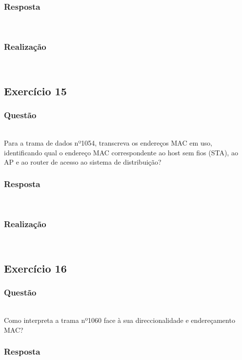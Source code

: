 \documentclass{llncs}
\begin{document}
\subsubsection{Resposta}\rule[-10pt]{0pt}{10pt}\\


\subsubsection{Realização}\rule[-10pt]{0pt}{10pt}\\


\clearpage
\subsection{Exercício 15}
\subsubsection{Questão}\rule[-10pt]{0pt}{10pt}\\

Para a trama de dados nº1054, transcreva os endereços MAC em uso, identificando qual o endereço MAC correspondente ao host sem fios (STA), ao AP e ao router de acesso ao sistema de distribuição?

\subsubsection{Resposta}\rule[-10pt]{0pt}{10pt}\\



\subsubsection{Realização}\rule[-10pt]{0pt}{10pt}\\



\clearpage
\subsection{Exercício 16}
\subsubsection{Questão}\rule[-10pt]{0pt}{10pt}\\

Como interpreta a trama nº1060 face à sua direccionalidade e endereçamento MAC?

\subsubsection{Resposta}\rule[-10pt]{0pt}{10pt}\\
\end{document}
